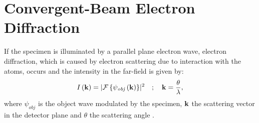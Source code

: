 \chapter{Convergent-Beam Electron Diffraction} \label{chap:appendix-CBED}
If the specimen is illuminated by a parallel plane electron wave, electron diffraction, which is caused by electron scattering due to interaction with the atoms, occurs and the intensity in the far-field is given by:
\begin{equation}
  I\left(\vb{k}\right) = \lvert\mathcal{F}\left\{\psi_{\mathit{obj}}\left(\vb{k}\right)\right\}\rvert^2 \quad ; \quad \vb{k} = \frac{\theta}{\lambda},
\end{equation}
where $\psi_{\mathit{obj}}$ is the object wave modulated by the specimen, $\vb{k}$ the scattering vector in the detector plane and $\theta$ the scattering angle \cite{Hawkes2019,Williams2009}.

